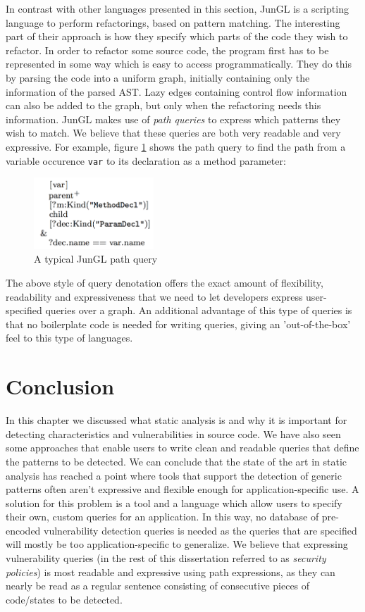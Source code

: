 In contrast with other languages presented in this section, JunGL\cite{JunGL} is a scripting language to perform refactorings, based on pattern matching. The interesting part of their approach is how they specify which parts of the code they wish to refactor. In order to refactor some source code, the program first has to be represented in some way which is easy to access programmatically. They do this by parsing the code into a uniform graph, initially containing only the information of the parsed AST. Lazy edges containing control flow information can also be added to the graph, but only when the refactoring needs this information. JunGL makes use of \textit{path queries} to express which patterns they wish to match. We believe that these queries are both very readable and very expressive. For example, figure \ref{fig:JunGL} shows the path query to find the path from a variable occurence \texttt{var} to its declaration as a method parameter:

\begin{figure}[!ht]
    \centering
      \includegraphics[width=0.4\textwidth]{images/JunGL} 
      \caption{A typical JunGL path query}
    \label{fig:JunGL}
\end{figure}

The above style of query denotation offers the exact amount of flexibility, readability and expressiveness that we need to let developers express user-specified queries over a graph. An additional advantage of this type of queries is that no boilerplate code is needed for writing queries, giving an 'out-of-the-box' feel to this type of languages.


\section{Conclusion}
In this chapter we discussed what static analysis is and why it is important for detecting characteristics and vulnerabilities in source code. We have also seen some approaches that enable users to write clean and readable queries that define the patterns to be detected. We can conclude that the state of the art in static analysis has reached a point where tools that support the detection of generic patterns often aren't expressive and flexible enough for application-specific use. A solution for this problem is a tool and a language which allow users to specify their own, custom queries for an application. In this way, no database of pre-encoded vulnerability detection queries is needed as the queries that are specified will mostly be too application-specific to generalize. We believe that expressing vulnerability queries (in the rest of this dissertation referred to as \textit{security policies}) is most readable and expressive using path expressions, as they can nearly be read as a regular sentence consisting of consecutive pieces of code/states to be detected.